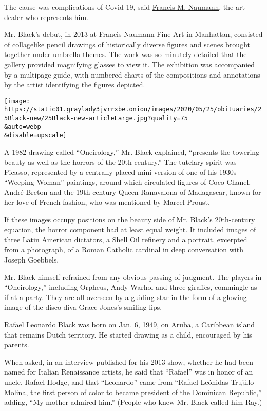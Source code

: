 The cause was complications of Covid-19, said
\href{http://www.francisnaumann.com/BLACK/Obit.html}{Francis M.
Naumann}, the art dealer who represents him.

Mr. Black's debut, in 2013 at Francis Naumann Fine Art in Manhattan,
consisted of collagelike pencil drawings of historically diverse figures
and scenes brought together under umbrella themes. The work was so
minutely detailed that the gallery provided magnifying glasses to view
it. The exhibition was accompanied by a multipage guide, with numbered
charts of the compositions and annotations by the artist identifying the
figures depicted.

\texttt{[image: https://static01.graylady3jvrrxbe.onion/images/2020/05/25/obituaries/25Black-new/25Black-new-articleLarge.jpg?quality=75\\\&auto=webp\\\&disable=upscale]}

A 1982 drawing called ``Oneirology,'' Mr. Black explained, ``presents
the towering beauty as well as the horrors of the 20th century.'' The
tutelary spirit was Picasso, represented by a centrally placed
mini-version of one of his 1930s ``Weeping Woman'' paintings, around
which circulated figures of Coco Chanel, André Breton and the
19th-century Queen Ranavalona of Madagascar, known for her love of
French fashion, who was mentioned by Marcel Proust.

If these images occupy positions on the beauty side of Mr. Black's
20th-century equation, the horror component had at least equal weight.
It included images of three Latin American dictators, a Shell Oil
refinery and a portrait, excerpted from a photograph, of a Roman
Catholic cardinal in deep conversation with Joseph Goebbels.

Mr. Black himself refrained from any obvious passing of judgment. The
players in ``Oneirology,'' including Orpheus, Andy Warhol and three
giraffes, commingle as if at a party. They are all overseen by a guiding
star in the form of a glowing image of the disco diva Grace Jones's
smiling lips.

Rafael Leonardo Black was born on Jan. 6, 1949, on Aruba, a Caribbean
island that remains Dutch territory. He started drawing as a child,
encouraged by his parents.

When asked, in an interview published for his 2013 show, whether he had
been named for Italian Renaissance artists, he said that ``Rafael'' was
in honor of an uncle, Rafael Hodge, and that ``Leonardo'' came from
``Rafael Leónidas Trujillo Molina, the first person of color to became
president of the Dominican Republic,'' adding, ``My mother admired
him.'' (People who knew Mr. Black called him Ray.)

